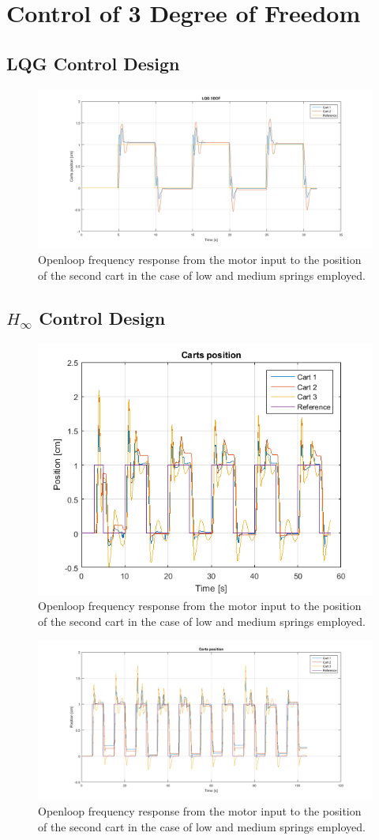 {\let\clearpage\relax \chapter{Control of 3 Degree of Freedom}}
\section{LQG Control Design}
\begin{figure}[h]
\centering
\includegraphics[width=0.5\linewidth]{img/lqg.png}
\caption{Openloop frequency response from the motor input to the position of the second cart in the case of low and medium springs employed.}
\label{fig:lqg3dof}
\end{figure}
\section{$H_\infty$ Control Design}
\begin{figure}[h]
\centering
\includegraphics[width=0.5\linewidth]{img/hinf1.png}
\caption{Openloop frequency response from the motor input to the position of the second cart in the case of low and medium springs employed.}
\label{fig:hinf13dof}
\end{figure}
\begin{figure}[h]
\centering
\includegraphics[width=0.5\linewidth]{img/hinf2.png}
\caption{Openloop frequency response from the motor input to the position of the second cart in the case of low and medium springs employed.}
\label{fig:hinf23dof}
\end{figure}